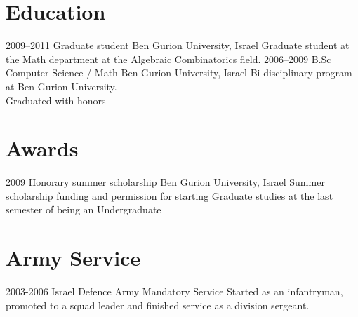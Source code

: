 \documentclass[]{friggeri-cv} %
\begin{document}

\section{Education}

\begin{entrylist}
\entry
{2009--2011}
{Graduate student}
{Ben Gurion University, Israel}
{Graduate student at the Math department at the Algebraic Combinatorics field.}
\entry
{2006--2009}
{B.Sc Computer Science / Math}
{Ben Gurion University, Israel}
{Bi-disciplinary program at Ben Gurion University.\\
Graduated with honors}
\end{entrylist}




\section{Awards}

\begin{entrylist}
\entry
{2009}
{Honorary summer scholarship}
{Ben Gurion University, Israel}
{Summer scholarship funding and permission for starting Graduate studies at the last semester of being an Undergraduate}
\end{entrylist}


\section{Army Service}

\begin{entrylist}
\entry
{2003-2006}
{Israel Defence Army}
{Mandatory Service}
{Started as an infantryman, promoted to a squad leader and finished service as a division sergeant.}
\end{entrylist}
\end{document}
